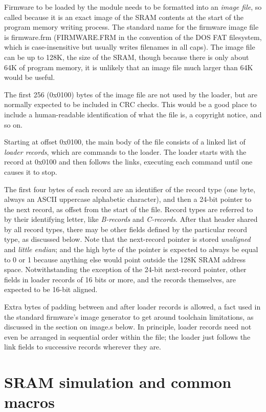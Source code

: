 Firmware to be loaded by the module needs to be formatted into an
\emph{image file}, so called because it is an exact image of the SRAM
contents at the start of the program memory writing process.  The standard
name for the firmware image file is firmware.frm (FIRMWARE.FRM in the
convention of the DOS FAT filesystem, which is case-insensitive but usually
writes filenames in all caps).  The image file can be up to 128K, the size
of the SRAM, though because there is only about 64K of program memory, it is
unlikely that an image file much larger than 64K would be useful.

The first 256 (0x0100) bytes of the image file are not used by the loader,
but are normally expected to be included in CRC checks.  This would be a
good place to include a human-readable identification of what the file is, a
copyright notice, and so on.

Starting at offset 0x0100, the main body of the file consists of a linked
list of \emph{loader records}, which are commands to the loader.  The loader
starts with the record at 0x0100 and then follows the links, executing each
command until one causes it to stop.

The first four bytes of each record are an identifier of the record type
(one byte, always an ASCII uppercase alphabetic character), and then a
24-bit pointer to the next record, as offset from the start of the file. 
Record types are referred to by their identifying letter, like
\emph{B-records} and \emph{C-records}.  After that header shared by all
record types, there may be other fields defined by the particular record
type, as discussed below.  Note that the next-record pointer is stored
\emph{unaligned} and \emph{little endian}; and the high byte of the pointer
is expected to always be equal to 0 or 1 because anything else would point
outside the 128K SRAM address space.  Notwithstanding the exception of the
24-bit next-record pointer, other fields in loader records of 16 bits or
more, and the records themselves, are expected to be 16-bit aligned.

Extra bytes of padding between and after loader records is allowed, a
fact used in the standard firmware's image generator to get around
toolchain limitations, as discussed in the section on image.s below.  In
principle, loader records need not even be arranged in sequential order
within the file; the loader just follows the link fields to successive
records wherever they are.

\section{SRAM simulation and common macros}

